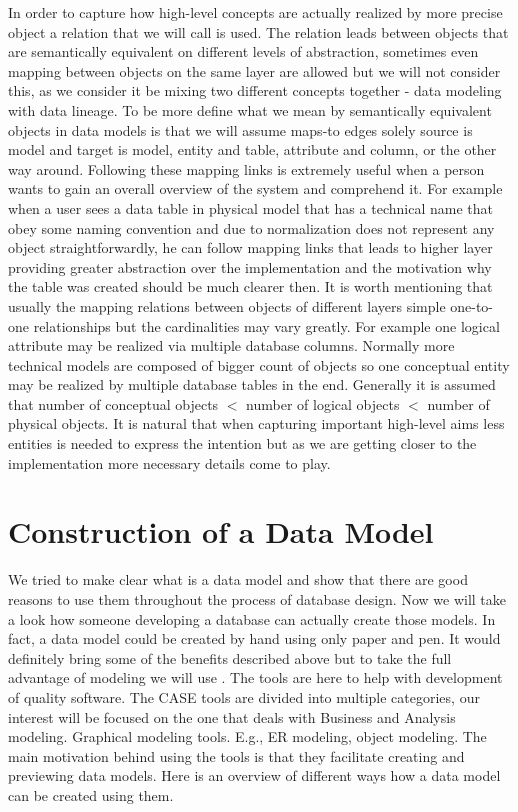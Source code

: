 In order to capture how high-level concepts are actually realized by more precise object a relation that we will call  is used. The relation leads between objects that are semantically equivalent on different levels of abstraction, sometimes even mapping between objects on the same layer are allowed but we will not consider this, as we consider it be mixing two different concepts together - data modeling with data lineage. To be more define what we mean by semantically equivalent objects in data models is that we will assume maps-to edges solely source is model and target is model, entity and table, attribute and column, or the other way around.
Following these mapping links is extremely useful when a person wants to gain an overall overview of the system and comprehend it. For example when a user sees a data table in physical model that has a technical name that obey some naming convention and due to normalization does not represent any object straightforwardly, he can follow mapping links that leads to higher layer providing greater  abstraction over the implementation and the motivation why the table was created should be much clearer then.
It is worth mentioning that usually the mapping relations between objects of different layers simple one-to-one relationships but the cardinalities may vary greatly. For example one logical attribute may be realized via multiple database columns.
Normally more technical models are composed of bigger count of objects so one conceptual entity may be realized by multiple database tables in the end. Generally it is assumed that number of conceptual objects $<$ number of logical objects $<$ number of physical objects. It is natural that when capturing important high-level aims less entities is needed to express the intention but as we are getting closer to the implementation more necessary details come to play.

\section{Construction of a Data Model}

We tried to make clear what is a data model and show that there are good reasons to use them throughout the process of database design.
Now we will take a look how someone developing a database can actually create those models.
In fact, a data model could be created by hand using only paper and pen. It would definitely bring some of the benefits described above but to take the full advantage of modeling we will use . The tools are here to help with development of quality software. The CASE tools are divided into multiple categories, our interest will be focused on the one that deals with Business and Analysis modeling. Graphical modeling tools. E.g., ER modeling, object modeling.
The main motivation behind using the tools is that they facilitate creating and previewing data models. Here is an overview of different ways how a data model can be created using them.

